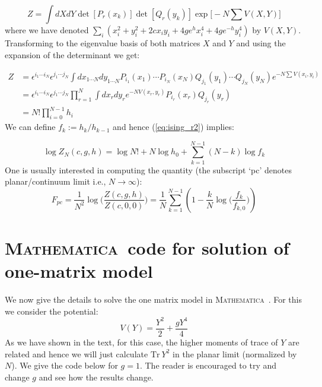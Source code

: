 \documentclass[11pt]{article}
\newcommand{\MA}{\textsc{Mathematica}}
\begin{document}
\begin{equation}
	Z = \int dX dY \det[P_{r}(x_k)] \det[Q_{r}(y_k)] \exp\Big[-N \sum V(X,Y)\Big]
\end{equation}
where we have denoted $\sum_{i} (x_{i}^2 + y_{i}^{2} +2c x_{i}y_{i} + 4ge^{h}x_{i}^{4} + 4ge^{-h}y_{i}^4)$ by $V(X,Y)$. Transforming to the eigenvalue basis of both matrices $X$ and $Y$ and using the expansion of the determinant we get:

\begin{align}
	Z &= \epsilon^{i_1 \cdots i_N} \epsilon^{j_1 \cdots j_N} \int dx_{1 \cdots N}
	dy_{1 \cdots N} P_{i_{1}}(x_1) \cdots P_{i_{N}}(x_N)
	Q_{j_{1}}(y_1) \cdots Q_{j_{N}}(y_N)
	e^{-N \sum V(x_i,y_i)} \nonumber  \\  
	&= \epsilon^{i_1 \cdots i_N} \epsilon^{j_1 \cdots j_N} \prod_{r=1}^{N} \int dx_{r} dy_{r} e^{-N V(x_r, y_r)} P_{i_r}(x_r) Q_{j_r}(y_r) \nonumber  \\  
	&=  N! \prod_{i=0}^{N-1} h_{i} 
	\label{eq:ising_r2}
\end{align}
We can define $f_{k} := h_k/h_{k-1}$ and hence 
(\ref{eq:ising_r2}) implies:

\begin{equation}
	\log Z_{N}(c,g,h) = \log N! + N \log h_0 + \sum_{k=1}^{N-1} (N-k) \log f_{k} 
\end{equation}
One is usually interested in computing the quantity (the subscript `pc' denotes planar/continuum limit i.e., $ N \to \infty$):
\begin{equation}
	F_{pc} = \frac{1}{N^2} \log\Bigg( \frac{Z(c,g,h)}{Z(c,0,0)}\Bigg) = \frac{1}{N} \sum_{k=1}^{N-1} \left(1 - \frac{k}{N} \log \Big(\frac{f_k}{f_{k,0}}\Big)\right)
\end{equation}




\section{\MA~code for solution of one-matrix model}
We now give the details to solve the one matrix model in \MA~. For this we consider the potential:
\[ V(Y) = \frac{Y^2}{2} + \frac{gY^4}{4} \] 
As we have shown in the text, for this case, the higher moments of trace of $Y$ are related and hence we will just calculate $\mbox{Tr}~Y^2$ in the planar limit (normalized by $N$). We give the code below for $g=1$. The reader is encouraged to try and change $g$ and see how the results change.
\end{document}
